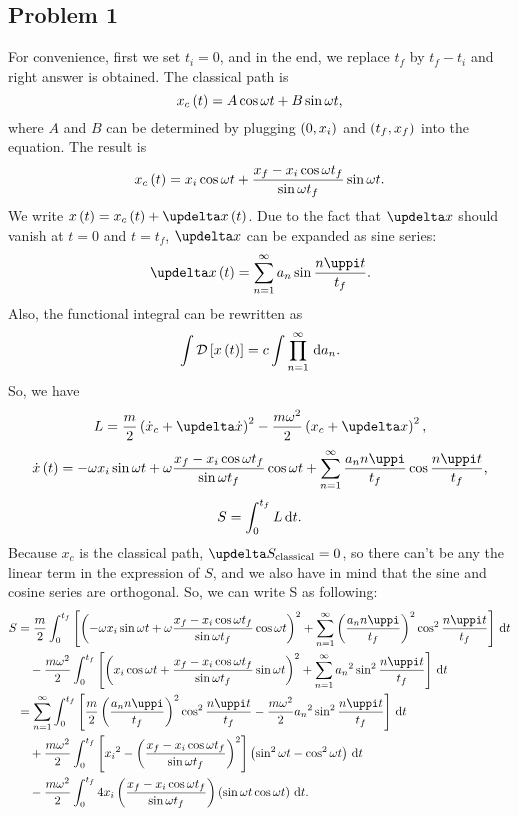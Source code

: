 \documentclass[11pt]{article}
\newcommand{\dd}{\,\mathrm{d}}
\begin{document}
\subsection*{Problem 1}
For convenience, first we set $t_i=0$, and in the end, we replace $t_f$ by $t_f-t_i$ and right answer is obtained.
The classical path is \[x_c\left( t\right)=A \cos\omega t+B\sin \omega t\text{,}\]where $A$ and $B$ can be determined by plugging $\left(0,x_i\right)$ and $\left( t_f, x_f\right)$ into the equation. The result is
\[x_c\left( t\right)=x_i \cos\omega t+\frac{x_f-x_i\cos\omega t_f}{\sin\omega t_f}\sin \omega t\text{.}\]
We write $x\lb t\rb=x_c\lb t\rb+\deltaup x\bt$. Due to the fact that $\deltaup x$ should vanish at $t=0$ and $t=t_f$, $\deltaup x$ can be expanded as sine series: \[\deltaup x\bt=\sum_{n=1}^\infty a_n\sin\frac{n\piup t}{t_f}\ed\]
Also, the functional integral can be rewritten as \[\int\mathcal{D}\left[x\bt\right]=c\int\prod_{n=1}^\infty \dd a_n\ed\]
So, we have
\[L=\frac{m}{2}\lb\dot{x}_c+\deltaup\dot{x}\rb^2-\frac{m\omega^2}{2}\lb x_c+\deltaup x\rb^2\ec\]
\[\dot{x}\bt=-\omega x_i \sin\omega t +\omega \frac{x_f-x_i\cos\omega t_f}{\sin\omega t_f}\cos\omega t+\sum_{n=1}^\infty\frac{a_n n \piup}{t_f}\cos\frac{n \piup t}{t_f}\ec\]
\[S=\int_0^{t_f} L\,\mathrm{d} t\text{.}\]
Because $x_c$ is the classical path, $\deltaup S_\text{classical}=0$, so there can't be any the linear term in the expression of $S$, and we also have in mind that the sine and cosine series are orthogonal. So, we can write S as following:
\[\begin{split}S&{}=\frac{m}{2}\int_0^{t_f}\left[\lb-\omega x_i\sin\omega t+\omega \frac{x_f-x_i\cos\omega t_f}{\sin\omega t_f}\cos\omega t\rb^2+\sum_{n=1}^\infty\lb\frac{a_n n \piup}{t_f}\rb^2\cos^2\frac{n \piup t}{t_f}\right]\ndd t\\%
&\quad{}-\frac{m\omega^2}{2}\int_0^{t_f}\left[\lb x_i\cos\omega t+ \frac{x_f-x_i\cos\omega t_f}{\sin\omega t_f}\sin\omega t\rb^2+\sum_{n=1}^\infty {a_n}^2\sin^2\frac{n \piup t}{t_f}\right]\ndd t\\%
&{}=\sum_{n=1}^\infty\int_0^{t_f}\left[\frac{m}{2}\lb\frac{a_n n \piup}{t_f}\rb^2\cos^2\frac{n \piup t}{t_f}-\frac{m\omega^2}{2}{a_n}^2\sin^2\frac{n \piup t}{t_f}\right]\ndd t\\%
&\quad{}+\frac{m\omega^2}{2}\int_0^{t_f}\left[ {x_i}^2-\lb\frac{x_f-x_i\cos\omega t_f}{\sin\omega t_f}\rb^2\right]\lb\sin^2\omega t-\cos^2\omega t\rb\ndd t\\%
&\quad{}-\frac{m\omega^2}{2}\int_0^{t_f}4 {x_i}\lb\frac{x_f-x_i\cos\omega t_f}{\sin\omega t_f}\rb\lb\sin\omega t\cos\omega t\rb\ndd t\ed\end{split}\]
\end{document}
